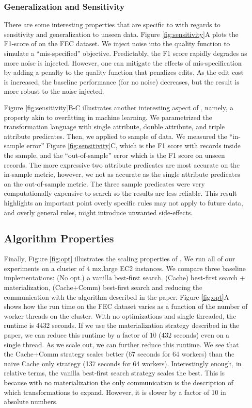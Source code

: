 \subsubsection{Generalization and Sensitivity}
There are some interesting properties that are specific to \sys with regards to sensitivity and generalization to unseen data. Figure \ref{fig:sensitivity}A plots the F1-score of \sys on the FEC dataset. We inject noise into the quality function to simulate a ``mis-specified'' objective. Predictably, the F1 score rapidly degrades as more noise is injected.
However, one can mitigate the effects of mis-specification by adding a penalty to the quality function that penalizes edits.
As the edit cost is increased, the baseline performance (for no noise) decreases, but the result is more robust to the noise injected.

Figure \ref{fig:sensitivity}B-C illustrates another interesting aspect of \sys, namely, a property akin to overfitting in machine learning.
We parametrized the transformation language with single attribute, double attribute, and triple attribute predicates.
Then, we applied \sys to sample of data.
We measured the ``in-sample error'' Figure \ref{fig:sensitivity}C, which is the F1 score with records inside the sample, and the ``out-of-sample'' error which is the F1 score on unseen records.
The more expressive two attribute predicates are most accurate on the in-sample metric, however, we not as accurate as the single attribute predicates on the out-of-sample metric.
The three sample predicates were very computationally expensive to search so the results are less reliable.
This result highlights an important point overly specific rules may not apply to future data, and overly general rules, might introduce unwanted side-effects.


\subsection{Algorithm Properties}
Finally, Figure \ref{fig:opt} illustrates the scaling properties of \sys. We run all of our experiments on a cluster of 4 mx.large EC2 instances. We compare three baseline implementations: (No opt.) a vanilla best-first search, (Cache) best-first search + materialization, (Cache+Comm) best-first search and reducing the communication with the algorithm described in the paper. 
Figure \ref{fig:opt}A shows how the run time on the FEC dataset varies as a function of the number of worker threads on the cluster.
With no optimizations and single threaded, the runtime is 4432 seconds.
If we use the materialization strategy described in the paper, we can reduce this runtime by a factor of 10 (432 seconds) even on a single thread.
As we scale out, we can further reduce this runtime.
We see that the Cache+Comm strategy scales better (67 seconds for 64 workers) than the naive Cache only strategy (137 seconds for 64 workers).
Interestingly enough, in relative terms, the vanilla best-first search strategy scales the best.
This is because with no materialization the only communication is the description of which transformations to expand.
However, it is slower by a factor of 10 in absolute numbers.


